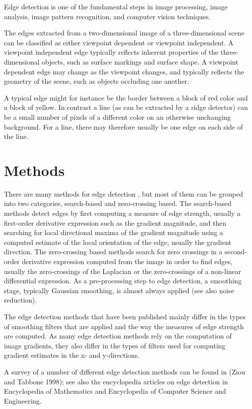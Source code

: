 \documentclass[BTech]{srmuthesis}
\begin{document}
Edge detection is one of the fundamental steps in image processing, image analysis, image pattern recognition, and computer vision techniques.

The edges extracted from a two-dimensional image of a three-dimensional scene can be classified as either viewpoint dependent or viewpoint independent. A viewpoint independent edge typically reflects inherent properties of the three-dimensional objects, such as surface markings and surface shape. A viewpoint dependent edge may change as the viewpoint changes, and typically reflects the geometry of the scene, such as objects occluding one another.

A typical edge might for instance be the border between a block of red color and a block of yellow. In contrast a line (as can be extracted by a ridge detector) can be a small number of pixels of a different color on an otherwise unchanging background. For a line, there may therefore usually be one edge on each side of the line.

\section{Methods}

There are many methods for edge detection \cite{wiki_edge_detection}, but most of them can be grouped into two categories, search-based and zero-crossing based. The search-based methods detect edges by first computing a measure of edge strength, usually a first-order derivative expression such as the gradient magnitude, and then searching for local directional maxima of the gradient magnitude using a computed estimate of the local orientation of the edge, usually the gradient direction. The zero-crossing based methods search for zero crossings in a second-order derivative expression computed from the image in order to find edges, usually the zero-crossings of the Laplacian or the zero-crossings of a non-linear differential expression. As a pre-processing step to edge detection, a smoothing stage, typically Gaussian smoothing, is almost always applied (see also noise reduction).

The edge detection methods that have been published mainly differ in the types of smoothing filters that are applied and the way the measures of edge strength are computed. As many edge detection methods rely on the computation of image gradients, they also differ in the types of filters used for computing gradient estimates in the x- and y-directions.

A survey of a number of different edge detection methods can be found in (Ziou and Tabbone 1998); see also the encyclopedia articles on edge detection in Encyclopedia of Mathematics and Encyclopedia of Computer Science and Engineering.
\end{document}
